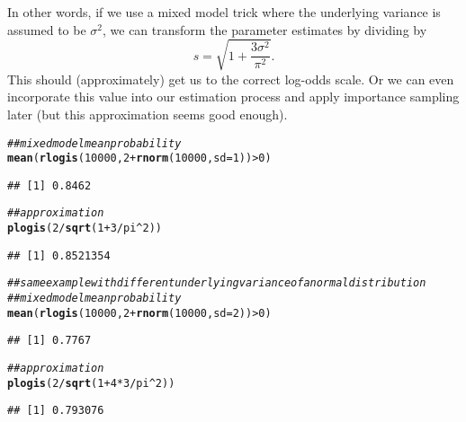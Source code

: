 \documentclass{article}\usepackage[]{graphicx}\usepackage[]{color}
\makeatletter
\newcommand{\hlnum}[1]{\textcolor[rgb]{0.686,0.059,0.569}{#1}}%
\newcommand{\hlcom}[1]{\textcolor[rgb]{0.678,0.584,0.686}{\textit{#1}}}%
\newcommand{\hlopt}[1]{\textcolor[rgb]{0,0,0}{#1}}%
\newcommand{\hlstd}[1]{\textcolor[rgb]{0.345,0.345,0.345}{#1}}%
\newcommand{\hlkwc}[1]{\textcolor[rgb]{0.333,0.667,0.333}{#1}}%
\newcommand{\hlkwd}[1]{\textcolor[rgb]{0.737,0.353,0.396}{\textbf{#1}}}%
\newenvironment{kframe}{%
 \def\at@end@of@kframe{}%
 \ifinner\ifhmode%
  \def\at@end@of@kframe{\end{minipage}}%
  \begin{minipage}{\columnwidth}%
 \fi\fi%
 \def\FrameCommand##1{\hskip\@totalleftmargin \hskip-\fboxsep
 \colorbox{shadecolor}{##1}\hskip-\fboxsep
     \hskip-\linewidth \hskip-\@totalleftmargin \hskip\columnwidth}%
 \MakeFramed {\advance\hsize-\width
   \@totalleftmargin\z@ \linewidth\hsize
   \@setminipage}}%
 {\par\unskip\endMakeFramed%
 \at@end@of@kframe}
\newenvironment{knitrout}{}{} %
\makeatother
\begin{document}
In other words, if we use a mixed model trick where the underlying variance is assumed to be $\sigma^2$, we can transform the parameter estimates by dividing by
$$
s =  \sqrt{1 + \frac{3\sigma^2}{\pi^2}}.
$$
This should (approximately) get us to the correct log-odds scale. Or we can even incorporate this value into our estimation process and apply importance sampling later (but this approximation seems good enough).

\begin{knitrout}
\color{fgcolor}\begin{kframe}
\begin{alltt}
\hlcom{## mixed model mean probability}
\hlkwd{mean}\hlstd{(}\hlkwd{rlogis}\hlstd{(}\hlnum{10000}\hlstd{,} \hlnum{2} \hlopt{+} \hlkwd{rnorm}\hlstd{(}\hlnum{10000}\hlstd{,} \hlkwc{sd}\hlstd{=}\hlnum{1}\hlstd{))} \hlopt{>} \hlnum{0}\hlstd{)}
\end{alltt}
\begin{verbatim}
## [1] 0.8462
\end{verbatim}
\begin{alltt}
\hlcom{## approximation}
\hlkwd{plogis}\hlstd{(}\hlnum{2}\hlopt{/}\hlkwd{sqrt}\hlstd{(}\hlnum{1} \hlopt{+} \hlnum{3}\hlopt{/}\hlstd{pi}\hlopt{^}\hlnum{2}\hlstd{))}
\end{alltt}
\begin{verbatim}
## [1] 0.8521354
\end{verbatim}
\begin{alltt}
\hlcom{## same example with different underlying variance of a normal distribution}
\hlcom{## mixed model mean probability}
\hlkwd{mean}\hlstd{(}\hlkwd{rlogis}\hlstd{(}\hlnum{10000}\hlstd{,} \hlnum{2} \hlopt{+} \hlkwd{rnorm}\hlstd{(}\hlnum{10000}\hlstd{,} \hlkwc{sd}\hlstd{=}\hlnum{2}\hlstd{))} \hlopt{>} \hlnum{0}\hlstd{)}
\end{alltt}
\begin{verbatim}
## [1] 0.7767
\end{verbatim}
\begin{alltt}
\hlcom{## approximation}
\hlkwd{plogis}\hlstd{(}\hlnum{2}\hlopt{/}\hlkwd{sqrt}\hlstd{(}\hlnum{1} \hlopt{+} \hlnum{4} \hlopt{*} \hlnum{3}\hlopt{/}\hlstd{pi}\hlopt{^}\hlnum{2}\hlstd{))}
\end{alltt}
\begin{verbatim}
## [1] 0.793076
\end{verbatim}
\end{kframe}
\end{knitrout}
\end{document}
